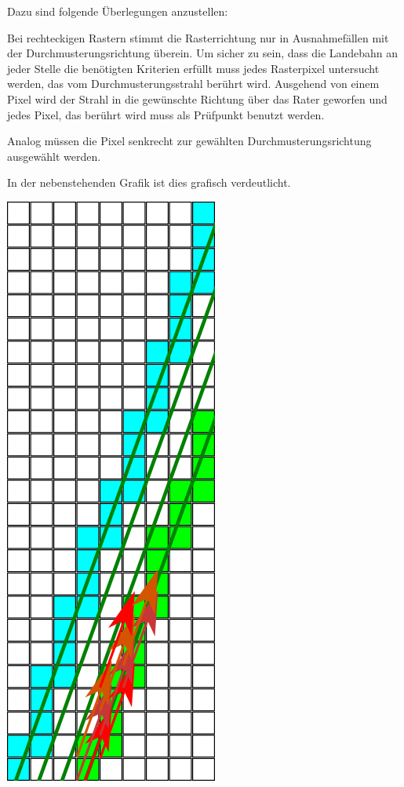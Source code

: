 \documentclass[
11pt, %
a4paper, %
oneside, %
pdfspacing, %
headinclude,
BCOR5mm, %
ngerman, %
bibtotocnumbered,
]{scrartcl}
\begin{document}
	Dazu sind folgende Überlegungen anzustellen:
	
 	\begin{minipage}{\textwidth}
 		\skippingparagraph
 		
		\begin{minipage}[t]{\textwidth-4cm}
			\vspace{0pt}
			Bei rechteckigen Rastern stimmt die Rasterrichtung nur in Ausnahmefällen mit der Durchmusterungsrichtung überein. Um sicher zu sein, dass die Landebahn an jeder Stelle die benötigten Kriterien erfüllt muss jedes Rasterpixel untersucht werden, das vom Durchmusterungsstrahl berührt wird. Ausgehend von einem Pixel wird der Strahl in die gewünschte Richtung über das Rater geworfen und jedes Pixel, das berührt wird muss als Prüfpunkt benutzt werden.
			
			Analog müssen die Pixel senkrecht zur gewählten Durchmusterungsrichtung ausgewählt werden.
			
			In der nebenstehenden Grafik ist dies grafisch verdeutlicht.
		\end{minipage}
		\begin{minipage}[t]{3cm}
			\vspace{0pt}
			\centering
			\includegraphics{./drawings/Durchmusterungspfad.png}
		\end{minipage}
	\skippingparagraph
	\end{minipage}
	
\end{document}
